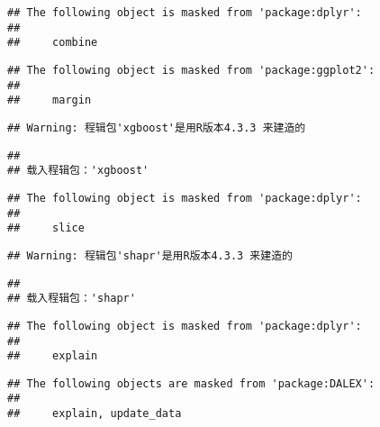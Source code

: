 \documentclass[
]{article}
\begin{document}
\begin{verbatim}
## The following object is masked from 'package:dplyr':
## 
##     combine
\end{verbatim}

\begin{verbatim}
## The following object is masked from 'package:ggplot2':
## 
##     margin
\end{verbatim}

\begin{verbatim}
## Warning: 程辑包'xgboost'是用R版本4.3.3 来建造的
\end{verbatim}

\begin{verbatim}
## 
## 载入程辑包：'xgboost'
\end{verbatim}

\begin{verbatim}
## The following object is masked from 'package:dplyr':
## 
##     slice
\end{verbatim}

\begin{verbatim}
## Warning: 程辑包'shapr'是用R版本4.3.3 来建造的
\end{verbatim}

\begin{verbatim}
## 
## 载入程辑包：'shapr'
\end{verbatim}

\begin{verbatim}
## The following object is masked from 'package:dplyr':
## 
##     explain
\end{verbatim}

\begin{verbatim}
## The following objects are masked from 'package:DALEX':
## 
##     explain, update_data
\end{verbatim}
\end{document}
